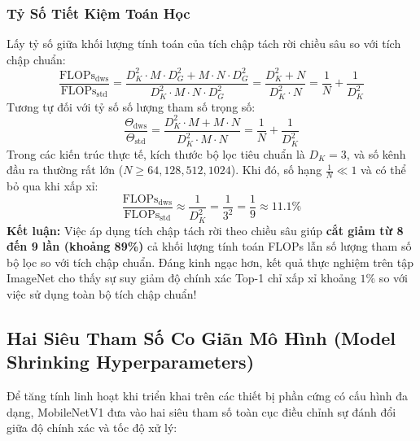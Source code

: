 \documentclass[12pt,a4paper]{report}
\begin{document}
\subsubsection{Tỷ Số Tiết Kiệm Toán Học}
Lấy tỷ số giữa khối lượng tính toán của tích chập tách rời chiều sâu so với tích chập chuẩn:
\begin{equation}
    \frac{\text{FLOPs}_{\text{dws}}}{\text{FLOPs}_{\text{std}}} = \frac{D_K^2 \cdot M \cdot D_G^2 + M \cdot N \cdot D_G^2}{D_K^2 \cdot M \cdot N \cdot D_G^2} = \frac{D_K^2 + N}{D_K^2 \cdot N} = \frac{1}{N} + \frac{1}{D_K^2}
\end{equation}
Tương tự đối với tỷ số số lượng tham số trọng số:
\begin{equation}
    \frac{\Theta_{\text{dws}}}{\Theta_{\text{std}}} = \frac{D_K^2 \cdot M + M \cdot N}{D_K^2 \cdot M \cdot N} = \frac{1}{N} + \frac{1}{D_K^2}
\end{equation}
Trong các kiến trúc thực tế, kích thước bộ lọc tiêu chuẩn là $D_K = 3$, và số kênh đầu ra thường rất lớn ($N \ge 64, 128, 512, 1024$). Khi đó, số hạng $\frac{1}{N} \ll 1$ và có thể bỏ qua khi xấp xỉ:
\begin{equation}
    \frac{\text{FLOPs}_{\text{dws}}}{\text{FLOPs}_{\text{std}}} \approx \frac{1}{D_K^2} = \frac{1}{3^2} = \frac{1}{9} \approx 11.1\%
\end{equation}
\textbf{Kết luận:} Việc áp dụng tích chập tách rời theo chiều sâu giúp \textbf{cắt giảm từ 8 đến 9 lần (khoảng 89\%)} cả khối lượng tính toán FLOPs lẫn số lượng tham số bộ lọc so với tích chập chuẩn. Đáng kinh ngạc hơn, kết quả thực nghiệm trên tập ImageNet cho thấy sự suy giảm độ chính xác Top-1 chỉ xấp xỉ khoảng $1\%$ so với việc sử dụng toàn bộ tích chập chuẩn!

\subsection{Hai Siêu Tham Số Co Giãn Mô Hình (Model Shrinking Hyperparameters)}
Để tăng tính linh hoạt khi triển khai trên các thiết bị phần cứng có cấu hình đa dạng, MobileNetV1 đưa vào hai siêu tham số toàn cục điều chỉnh sự đánh đổi giữa độ chính xác và tốc độ xử lý:
\end{document}
